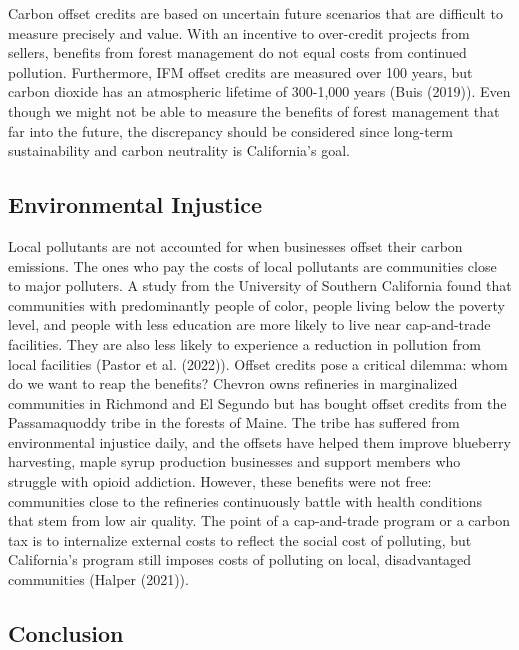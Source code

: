 \documentclass[11pt]{article}
\begin{document}
Carbon offset credits are based on uncertain future scenarios that are difficult to measure precisely and value. With an incentive to over-credit projects from sellers, benefits from forest management do not equal costs from continued pollution. Furthermore, IFM offset credits are measured over 100 years, but carbon dioxide has an atmospheric lifetime of 300-1,000 years (Buis (2019)). Even though we might not be able to measure the benefits of forest management that far into the future, the discrepancy should be considered since long-term sustainability and carbon neutrality is California's goal.

\subsection*{Environmental Injustice}

Local pollutants are not accounted for when businesses offset their carbon emissions. The ones who pay the costs of local pollutants are communities close to major polluters. A study from the University of Southern California found that communities with predominantly people of color, people living below the poverty level, and people with less education are more likely to live near cap-and-trade facilities. They are also less likely to experience a reduction in pollution from local facilities (Pastor et al. (2022)). Offset credits pose a critical dilemma: whom do we want to reap the benefits? Chevron owns refineries in marginalized communities in Richmond and El Segundo but has bought offset credits from the Passamaquoddy tribe in the forests of Maine. The tribe has suffered from environmental injustice daily, and the offsets have helped them improve blueberry harvesting, maple syrup production businesses and support members who struggle with opioid addiction. However, these benefits were not free: communities close to the refineries continuously battle with health conditions that stem from low air quality. The point of a cap-and-trade program or a carbon tax is to internalize external costs to reflect the social cost of polluting, but California's program still imposes costs of polluting on local, disadvantaged communities (Halper (2021)).


\subsection*{Conclusion}
\end{document}
